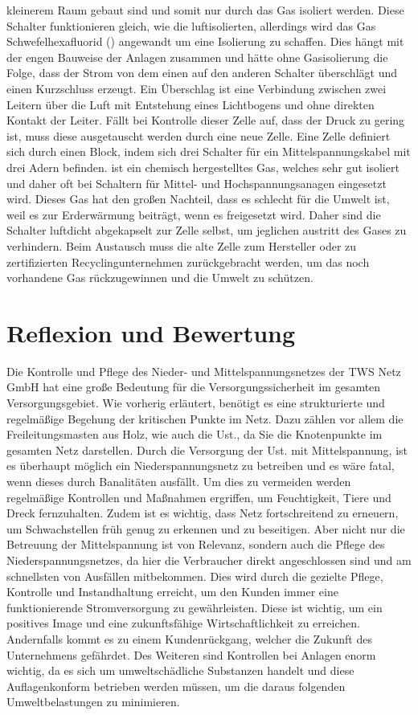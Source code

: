 kleinerem Raum gebaut sind und somit nur durch das Gas isoliert werden. Diese Schalter funktionieren gleich, wie die luftisolierten, allerdings wird 
das Gas Schwefelhexafluorid () angewandt um eine Isolierung zu schaffen. Dies hängt mit der engen Bauweise der Anlagen zusammen und hätte ohne 
Gasisolierung die Folge, dass der Strom von dem einen auf den anderen Schalter überschlägt und einen Kurzschluss erzeugt. Ein Überschlag ist eine 
Verbindung zwischen zwei Leitern über die Luft mit Entstehung eines Lichtbogens und ohne direkten Kontakt der Leiter. Fällt bei Kontrolle dieser  
Zelle auf, dass der Druck zu gering ist, muss diese ausgetauscht werden durch eine neue Zelle. Eine Zelle definiert sich durch einen Block, indem sich 
drei Schalter für ein Mittelspannungskabel mit drei Adern befinden.  ist ein chemisch hergestelltes Gas, welches sehr gut isoliert und daher oft 
bei Schaltern für Mittel- und Hochspannungsanagen eingesetzt wird. Dieses Gas hat den großen Nachteil, dass es schlecht für die Umwelt ist, weil es 
zur Erderwärmung beiträgt, wenn es freigesetzt wird. Daher sind die  Schalter luftdicht abgekapselt zur Zelle selbst, um jeglichen austritt des 
Gases zu verhindern. Beim Austausch muss die alte Zelle zum Hersteller oder zu zertifizierten Recyclingunternehmen zurückgebracht werden, um das 
noch vorhandene Gas rückzugewinnen und die Umwelt zu schützen. 

\section{Reflexion und Bewertung}

Die Kontrolle und Pflege des Nieder- und Mittelspannungsnetzes der TWS Netz GmbH hat eine große Bedeutung für die Versorgungssicherheit im gesamten 
Versorgungsgebiet. Wie vorherig erläutert, benötigt es eine strukturierte und regelmäßige Begehung der kritischen Punkte im Netz. Dazu zählen vor allem 
die Freileitungsmasten aus Holz, wie auch die Ust., da Sie die Knotenpunkte im gesamten Netz darstellen. Durch die Versorgung der Ust. mit Mittelspannung, 
ist es überhaupt möglich ein Niederspannungsnetz zu betreiben und es wäre fatal, wenn dieses durch Banalitäten ausfällt. Um dies zu vermeiden werden 
regelmäßige Kontrollen und Maßnahmen ergriffen, um \zB Feuchtigkeit, Tiere und Dreck fernzuhalten. Zudem ist es wichtig, dass Netz fortschreitend zu 
erneuern, um Schwachstellen früh genug zu erkennen und zu beseitigen. Aber nicht nur die Betreuung der Mittelspannung ist von Relevanz, sondern auch 
die Pflege des Niederspannungsnetzes, da hier die Verbraucher direkt angeschlossen sind und am schnellsten von Ausfällen mitbekommen. Dies wird durch 
die gezielte Pflege, Kontrolle und Instandhaltung erreicht, um den Kunden immer eine funktionierende Stromversorgung zu gewährleisten. Diese ist 
wichtig, um ein positives Image und eine zukunftsfähige Wirtschaftlichkeit zu erreichen. Andernfalls kommt es zu einem Kundenrückgang, welcher die Zukunft
des Unternehmens gefährdet. Des Weiteren sind Kontrollen bei  Anlagen enorm wichtig, da es sich um umweltschädliche Substanzen handelt und 
diese Auflagenkonform betrieben werden müssen, um die daraus folgenden Umweltbelastungen zu minimieren. 

\clearpage
